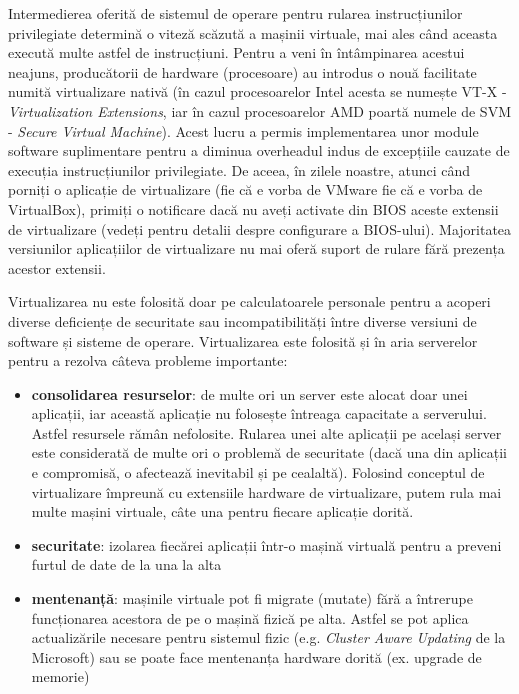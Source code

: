 Intermedierea oferită de sistemul de operare pentru rularea instrucțiunilor privilegiate
determină o viteză scăzută a mașinii virtuale, mai ales când aceasta
execută multe astfel de instrucțiuni. Pentru a veni în întâmpinarea acestui
neajuns, producătorii de hardware (procesoare) au introdus o nouă facilitate
numită virtualizare nativă (în cazul procesoarelor Intel acesta se numește VT-X
- \textit{Virtualization Extensions}, iar în cazul procesoarelor AMD poartă numele de SVM
- \textit{Secure Virtual Machine}). Acest lucru a permis implementarea unor module
software suplimentare pentru a diminua overheadul indus de excepțiile cauzate
de execuția instrucțiunilor privilegiate. De aceea, în zilele noastre, atunci
când porniți o aplicație de virtualizare (fie că e vorba de VMware fie că e
vorba de VirtualBox), primiți o notificare dacă nu aveți activate din BIOS
aceste extensii de virtualizare (vedeți 
pentru detalii despre configurare a BIOS-ului). Majoritatea versiunilor
aplicațiilor de virtualizare nu mai oferă suport de rulare fără prezența acestor
extensii.

Virtualizarea nu este folosită doar pe calculatoarele personale pentru a acoperi
diverse deficiențe de securitate sau incompatibilități între diverse versiuni de
software și sisteme de operare. Virtualizarea este folosită și în aria
serverelor pentru a rezolva câteva probleme importante:

\begin{itemize}
  \item \textbf{consolidarea resurselor}: de multe ori un server este alocat doar
		unei aplicații, iar această aplicație nu folosește întreaga
		capacitate a serverului. Astfel resursele rămân nefolosite.
		Rularea unei alte aplicații pe același server este considerată
		de multe ori o problemă de securitate (dacă una din aplicații e
		compromisă, o afectează inevitabil și pe cealaltă). Folosind
		conceptul de virtualizare împreună cu extensiile hardware de
		virtualizare, putem rula mai multe mașini virtuale, câte una
		pentru fiecare aplicație dorită.
  \item \textbf{securitate}: izolarea fiecărei aplicații într-o mașină virtuală
		pentru a preveni furtul de date de la una la alta
  \item \textbf{mentenanță}: mașinile virtuale pot fi migrate (mutate)
		fără a întrerupe funcționarea acestora de pe o mașină fizică pe
		alta. Astfel se pot aplica actualizările necesare pentru
		sistemul fizic (e.g. \textit{Cluster Aware Updating} de la
		Microsoft) sau se poate face mentenanța hardware dorită (ex.
		upgrade de memorie)
\end{itemize}

